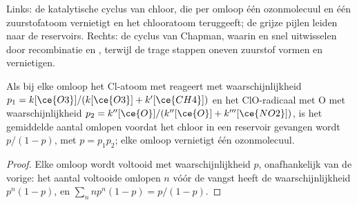 \begin{omfigure}

{\small Links: de katalytische cyclus van chloor, die per omloop één
ozonmolecuul en één zuurstofatoom vernietigt en het chlooratoom teruggeeft;
de grijze pijlen leiden naar de reservoirs. Rechts: de cyclus van Chapman,
waarin  en  snel uitwisselen door recombinatie en ,
terwijl de trage stappen oneven zuurstof vormen en vernietigen.}
\end{omfigure}

\begin{proposition}\label{prop:b3:photochemistry:catalytic-destruction}
Als bij elke omloop het Cl-atoom met  reageert met
waarschijnlijkheid $p_1 =
k[\ce{O3}]/(k[\ce{O3}] + k'[\ce{CH4}])$ en het ClO-radicaal met O met
waarschijnlijkheid $p_2 =
k''[\ce{O}]/(k''[\ce{O}] + k'''[\ce{NO2}])$, is het gemiddelde aantal
omlopen voordat het chloor in een reservoir gevangen wordt $p/(1 - p)$, met $p = p_1p_2$; elke omloop vernietigt één
ozonmolecuul.
\end{proposition}

\begin{proof}
Elke omloop wordt voltooid met waarschijnlijkheid $p$, onafhankelijk van
de vorige: het aantal voltooide omlopen $n$ vóór de vangst heeft de waarschijnlijkheid $p^n(1 -
p)$, en $\sum_nnp^n(1 - p) = p/(1 - p)$.
\end{proof}


